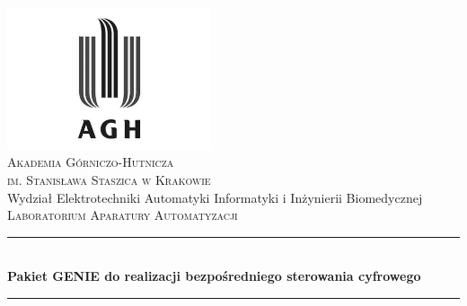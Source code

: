 \begin{titlepage}

\newcommand{\HRule}{\rule{\linewidth}{0.5mm}}

\center
 

\includegraphics[width=6cm]{../res/img/logo.png}\\[1cm]
 
 

\textsc{\LARGE Akademia Górniczo-Hutnicza \\[0.2cm]
im. Stanisława Staszica w Krakowie}\\[1.5cm]

\textrm{\Large Wydział Elektrotechniki Automatyki Informatyki i Inżynierii
Biomedycznej}\\[1cm]

\textsc{\Large Laboratorium Aparatury Automatyzacji}\\[0.5cm]


\HRule \\[0.4cm]
{ \huge \bfseries Pakiet GENIE do realizacji bezpośredniego sterowania 
cyfrowego}\\[0.4cm]
\HRule \\[1.5cm]


\end{titlepage}
